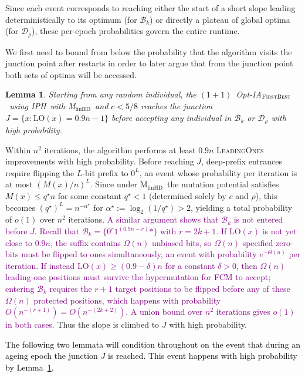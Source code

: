 \documentclass[lettersize,journal]{IEEEtran}
\newcommand{\rerev}[1]{\textcolor{purple}{#1}}
\newcommand{\linHD}{M$_{\text{linHD}}$}
\newcommand{\IPHfcm}{IPH}
\newtheorem{lemma}{Lemma}
\begin{document}
Since each event corresponds to reaching either the start of a short slope leading deterministically to its optimum (for $\mathcal{B}_k$) or directly a plateau of global optima (for $\mathcal{D}_\rho$), these per-epoch probabilities govern the entire runtime.

We first need to bound from below the probability that the algorithm visits the junction point after restarts in order to later argue that from the junction point both sets of optima will be accessed.

\begin{lemma} \label{lem:junction-first-density-Bk}
	Starting from any random individual, the $(1+1)$~Opt-IA$_{\textsc{FirstBest}}$~using \IPHfcm{}~with \linHD~\textcolor{black}{and $c<5/8$}  reaches the junction $J = \{x : \mathrm{LO}(x)=0.9n-1\}$ before accepting any individual in $\mathcal{B}_k$ or $\mathcal{D}_\rho$ with high probability.
\end{lemma}

Within $n^2$ iterations, the algorithm performs at least $0.9n$ \textsc{LeadingOnes} 
improvements with high probability.  
Before reaching $J$, deep-prefix entrances require flipping the $L$-bit prefix 
to $0^L$, an event whose probability per iteration is at most $(M(x)/n)^L$.  
Since under \linHD\ the mutation potential satisfies $M(x) \le q^\star n$ for 
some constant $q^\star < 1$ (determined solely by $c$ and $\rho$), this becomes 
$(q^\star)^L = n^{-\alpha^\star}$ for $\alpha^\star := \log_2(1/q^\star) > 2$, 
yielding a total probability of $o(1)$ over $n^2$ iterations.
\rerev{A similar argument shows that $\mathcal{B}_k$ is not entered before $J$.
Recall that $\mathcal{B}_k = \{0^r 1^{(0.9n-r)}*\}$ with $r = 2k+1$.
If $\mathrm{LO}(x)$ is not yet close to $0.9n$, the suffix contains
$\Omega(n)$ unbiased bits, so $\Omega(n)$ specified zero-bits must be
flipped to ones simultaneously, an event with probability
$e^{-\Theta(n)}$ per iteration.
If instead $\mathrm{LO}(x) \geq (0.9-\delta)n$ for a constant $\delta > 0$,
then $\Omega(n)$ leading-one positions must survive the hypermutation
for FCM to accept; entering $\mathcal{B}_k$ requires the $r+1$ target
positions to be flipped before any of these $\Omega(n)$ protected
positions, which happens with probability $O(n^{-(r+1)}) = O(n^{-(2k+2)})$.
A union bound over $n^2$ iterations gives $o(1)$ in both cases.}
Thus the slope is climbed to $J$ with high probability.



\textcolor{black}{The following two lemmata will condition throughout on the event that during an ageing epoch the junction $J$ is reached.
This event happens with high probability by Lemma~\ref{lem:junction-first-density-Bk}.}
\end{document}
